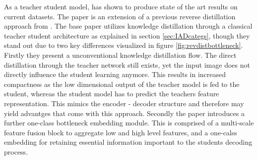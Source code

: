 As a teacher student model, \cite{revdist2023} has shown to produce state of the art results on current datasets. The paper is an extension of a previous reverse distillation approach from 
\cite{Deng_2022basicrevdist}. The base paper utilizes knowledge distillation through a classical teacher student architecture as explained in section \ref{sec:IADcategs}, though they stand out 
due to two key differences visualized in figure \ref{fig:revdistbottleneck}. Firstly they present a unconventional knowledge distillation flow. The direct distillation through the teacher network still exists, 
yet the input image does not directly influence the student learning anymore. This results in increased compactness as the low dimensional output of the teacher model is fed to the student, 
whereas the student model has to predict the teachers feature representation. This mimics the encoder - decoder structure and therefore may yield advantges that come with this approach. Secondly 
the paper introduces a further one-class bottleneck embedding module. This is comprised of a multi-scale feature fusion block to aggregate low and high level features, and a one-calss embedding 
for retaining essential information important to the students decoding process. 


